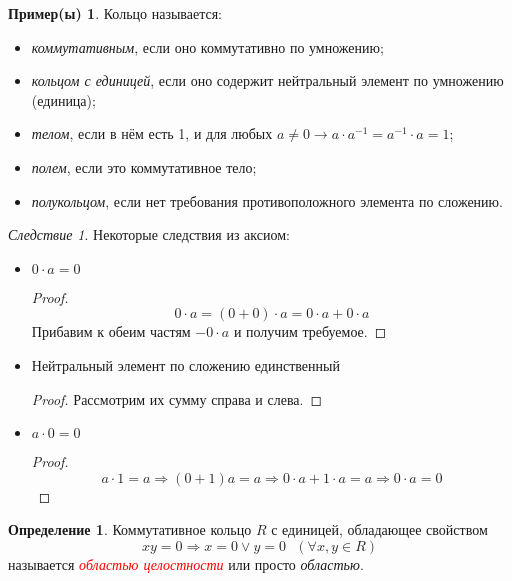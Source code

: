 \documentclass[a4paper,100pt]{article}
\theoremstyle{indented}
\theoremstyle{definition}
\newtheorem{defn}{Определение}
\newtheorem{exl}{Пример(ы)}
\theoremstyle{remark}
\newtheorem{cons}{Следствие}
\begin{document}
\begin{exl}
    Кольцо называется:\

    \begin{itemize}
        \item \textit{коммутативным}, если оно коммутативно по умножению;
        \item \textit{кольцом с единицей}, если оно содержит нейтральный элемент по умножению (единица);
        \item \textit{телом}, если в нём есть 1, и для любых $a\neq 0 \rightarrow a \cdot a^{-1}=a^{-1}\cdot a=1$;
        \item \textit{полем}, если это коммутативное тело;
        \item \textit{полукольцом}, если нет требования противоположного элемента по сложению.
    \end{itemize}
\end{exl}

\begin{cons}
    Некоторые следствия из аксиом:\

    \begin{itemize}
        \item $0\cdot a = 0$
        \begin{proof}
            \[
               0\cdot a = (0+0)\cdot a = 0\cdot a + 0\cdot a
            \]
            Прибавим к обеим частям $-0\cdot a$ и получим требуемое.
        \end{proof}
        \item Нейтральный элемент по сложению единственный
        \begin{proof}
            Рассмотрим их сумму справа и слева.
        \end{proof}
        \item $a\cdot 0 = 0$
        \begin{proof}
            \[
                a\cdot 1 = a \Longrightarrow (0+1)a = a \Longrightarrow 0\cdot a+1\cdot a = a \Longrightarrow 0\cdot a = 0
            \]
        \end{proof}
    \end{itemize}
\end{cons}

\begin{defn}
    Коммутативное кольцо $R$ с единицей, обладающее свойством
    \[
        xy=0 \Longrightarrow x=0 \vee y=0 \text{ }(\forall x, y\in R)
    \]
    называется \hypertarget{n2}{\textcolor{red}{\textit{областью целостности}}} или просто \textit{областью}.
\end{defn}
\end{document}
